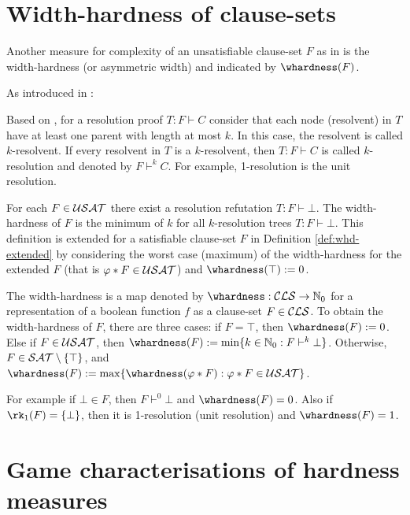\documentclass{report}
\begin{document}
\section{Width-hardness of clause-sets}
\label{sec:whdd}


Another measure for complexity of an unsatisfiable clause-set $F$ as in \cite{h18, h13} is the width-hardness (or asymmetric width) and indicated by $\whardness(F)$. 

As introduced in \cite{h19}:
\begin{defi}\label{def:kres}
Based on \cite{h33}, for a resolution proof $T: F \vdash C$ consider that each node (resolvent) in $T$ have at least one parent with length at most $k$. In this case, the resolvent is called $k$-resolvent. If every resolvent in $T$ is a $k$-resolvent, then $T:F \vdash C$ is called $k$-resolution and denoted by $F \vdash^k C$. For example, 1-resolution is the unit resolution.
\end{defi}

For each $F \in \mathcal{USAT}$ there exist a resolution refutation $T:F \vdash \bot$. The width-hardness of $F$ is the minimum of $k$ for all $k$-resolution trees $T:F \vdash \bot$. This definition is extended for a satisfiable clause-set $F$ in Definition \ref{def:whd-extended} by considering the worst case (maximum) of the width-hardness for the extended $F$ (that is $ \varphi * F \in \mathcal{USAT}$) and $\whardness(\top):=0$.

\begin{defi}\label{def:whd-extended}
The width-hardness is a map denoted by $\whardness : \Cls \rightarrow \NNZ$ for a representation of a boolean function $f$ as a clause-set $F \in \mathcal{CLS}$. To obtain the width-hardness of  $F$, there are three cases: if $F = \top$, then $\whardness(F) := 0$. Else if $F \in \mathcal{USAT}$, then $\whardness(F) := \min \set{k \in \NNZ : F \vdash^k \bot}$. Otherwise, $F \in \mathcal{SAT} \setminus \{ \top \}$, and $\whardness(F) := \max \set{ \whardness(\vp * F) : \vp * F \in \Usat }$.
\end{defi}

For example if $\bot \in F$, then $F \vdash^0 \bot$ and $\whardness(F)=0$. Also if $\rk_1(F)=\set{\bot}$, then it is 1-resolution (unit resolution) and  $\whardness(F)=1$.
\section{Game characterisations of hardness measures}
\label{sec:game-pd}
\end{document}
